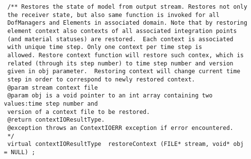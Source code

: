 \documentclass[12pt,draft]{article}
\begin{document}
{\begin{verbatim}
 /** Restores the state of model from output stream. Restores not only
 the receiver state, but also same function is invoked for all
 DofManagers and Elements in associated domain. Note that by restoring
 element context also contexts of all associated integration points
 (and material statuses) are restored.  Each context is associated
 with unique time step. Only one context per time step is
 allowed. Restore context function will restore such contex, which is
 related (through its step number) to time step number and version
 given in obj parameter.  Restoring context will change current time
 step in order to correspond to newly restored context.
 @param stream context file
 @param obj is a void pointer to an int array containing two values:time step number and 
 version of a context file to be restored.
 @return contextIOResultType.
 @exception throws an ContextIOERR exception if error encountered.
 */
 virtual contextIOResultType  restoreContext (FILE* stream, void* obj = NULL) ;


\end{verbatim}}
\end{document}
